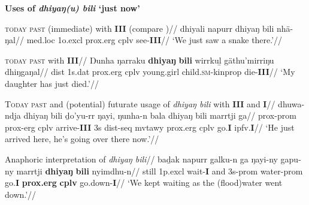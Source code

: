 \pex{}\textbf{Uses of \textit{dhiyaŋ(u) bili} `just now'}

\a{}\begingl\glpreamble\textsc{today past} (immediate) with \textbf{III} (compare )//
\gla dhiyali napurr dhiyaŋ bili nhä-ŋal//
\glb \gls{med}.\gls{loc} 1o.\gls{excl} \gls{prox}.\gls{erg} \gls{cplv} see-\textbf{III}//
\glft`We just saw a snake there.'//\endgl

\a{}\begingl\glpreamble \textsc{today past} with \textbf{III}//
\gla Ŋunha ŋarraku \textbf{dhiyaŋ} \textbf{bili} wirrkuḻ gäthu'mirriŋu dhiŋgaŋal//
\glb \gls{dist} 1s.\gls{dat} \gls{prox}.\gls{erg} \gls{cplv} young.girl child.\textsc{sm}-\gls{kinprop} die-\textbf{III}//
\glft`My daughter has just died.'\trailingcitation{[DB Mathuyu 9:18]}//\endgl

\a{}\begingl\glpreamble \textsc{Today past} and (potential) futurate usage of \textit{dhiyaŋ bili} with \textbf{III} and \textbf{I}//
\gla dhuwa-ndja dhiyaŋ bili ḏo'yu-rr ŋayi, ŋunha-n bala dhiyaŋ bili marrtji ga//
\glb \gls{prox}-\gls{prom} \gls{prox}-\gls{erg} \gls{cplv} arrive-\textbf{III} 3s \gls{dist}-\gls{seq} \gls{mvtawy} \gls{prox}.\gls{erg} \gls{cplv} go.\textbf{I} \gls{ipfv}.\textbf{I}//
\glft`He just arrived here, he's going over there now.'//\endgl

\a{}\begingl\glpreamble Anaphoric interpretation of \textit{dhiyaŋ bili}//
\gla baḏak napurr galku-n ga ŋayi-ny gapu-ny marrtji \textbf{dhiyaŋ} \textbf{bili} nyimdhu-n//
\glb still 1p.\gls{excl} wait-\textbf{I} and 3s-\gls{prom} water-\gls{prom} go.\textbf{I} \textbf{\gls{prox}.\gls{erg}} \textbf{\gls{cplv}} go.down-\textbf{I}//
\glft`We kept waiting as the (flood)water went down.'//
\endgl{}




